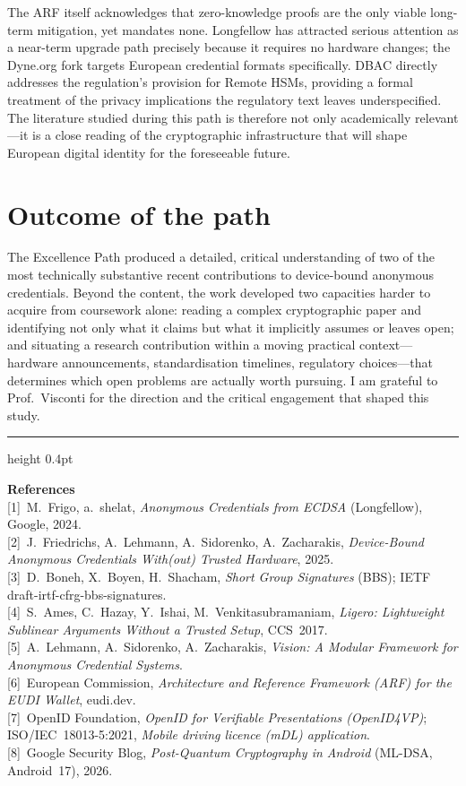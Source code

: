 \documentclass[11pt]{article}
\begin{document}
The ARF itself acknowledges that zero-knowledge proofs are the only viable
long-term mitigation, yet mandates none. Longfellow has attracted serious
attention as a near-term upgrade path precisely because it requires no
hardware changes; the Dyne.org fork targets European credential formats
specifically. DBAC directly addresses the regulation's provision for Remote
HSMs, providing a formal treatment of the privacy implications the regulatory
text leaves underspecified. The literature studied during this path is
therefore not only academically relevant---it is a close reading of the
cryptographic infrastructure that will shape European digital identity for
the foreseeable future.

\section{Outcome of the path}

The Excellence Path produced a detailed, critical understanding of two of
the most technically substantive recent contributions to device-bound
anonymous credentials. Beyond the content, the work developed two capacities
harder to acquire from coursework alone: reading a complex cryptographic
paper and identifying not only what it claims but what it implicitly assumes
or leaves open; and situating a research contribution within a moving
practical context---hardware announcements, standardisation timelines,
regulatory choices---that determines which open problems are actually worth
pursuing. I am grateful to Prof.\ Visconti for the direction and the
critical engagement that shaped this study.

\vspace{8pt}
{\color{accent}\hrule height 0.4pt}
\vspace{4pt}
{\footnotesize\noindent\textbf{\sffamily References}\\[3pt]
[1]~M.~Frigo, a.~shelat, \textit{Anonymous Credentials from ECDSA}
(Longfellow), Google, 2024.\\[1pt]
[2]~J.~Friedrichs, A.~Lehmann, A.~Sidorenko, A.~Zacharakis,
\textit{Device-Bound Anonymous Credentials With(out) Trusted Hardware}, 2025.\\[1pt]
[3]~D.~Boneh, X.~Boyen, H.~Shacham, \textit{Short Group Signatures} (BBS);
IETF draft-irtf-cfrg-bbs-signatures.\\[1pt]
[4]~S.~Ames, C.~Hazay, Y.~Ishai, M.~Venkitasubramaniam,
\textit{Ligero: Lightweight Sublinear Arguments Without a Trusted Setup}, CCS~2017.\\[1pt]
[5]~A.~Lehmann, A.~Sidorenko, A.~Zacharakis,
\textit{Vision: A Modular Framework for Anonymous Credential Systems}.\\[1pt]
[6]~European Commission, \textit{Architecture and Reference Framework (ARF)
for the EUDI Wallet}, eudi.dev.\\[1pt]
[7]~OpenID Foundation, \textit{OpenID for Verifiable Presentations (OpenID4VP)};
ISO/IEC~18013-5:2021, \textit{Mobile driving licence (mDL) application}.\\[1pt]
[8]~Google Security Blog, \textit{Post-Quantum Cryptography in Android}
(ML-DSA, Android~17), 2026.
}
\end{document}
